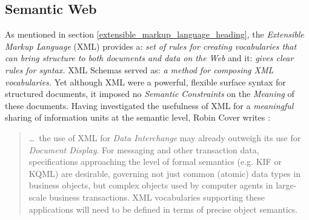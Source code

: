 %
%
%
%
%
%
%

\subsection{Semantic Web}
\label{semantic_web_heading}

As mentioned in section \ref{extensible_markup_language_heading}, the
\emph{Extensible Markup Language} (XML) \cite{rdfowlrelease} provides a:
\textit{set of rules for creating vocabularies that can bring structure to both
documents and data on the Web} and it: \textit{gives clear rules for syntax.}
XML Schemas \cite{xmlschema} served as: \textit{a method for composing XML
vocabularies.} Yet although XML were a powerful, flexible surface syntax for
structured documents, it imposed no \emph{Semantic Constraints} on the
\emph{Meaning} of these documents. Having investigated the usefulness of XML
for a \emph{meaningful} sharing of information units at the semantic level,
Robin Cover writes \cite{xmlsemantics}:

\begin{quote}
    \ldots\ the use of XML for \emph{Data Interchange} may already outweigh its
    use for \emph{Document Display}. For messaging and other transaction data,
    specifications approaching the level of formal semantics (e.g. KIF or KQML)
    are desirable, governing not just common (atomic) data types in business
    objects, but complex objects used by computer agents in large-scale business
    transactions. XML vocabularies supporting these applications will need to be
    defined in terms of precise object semantics.
\end{quote}


